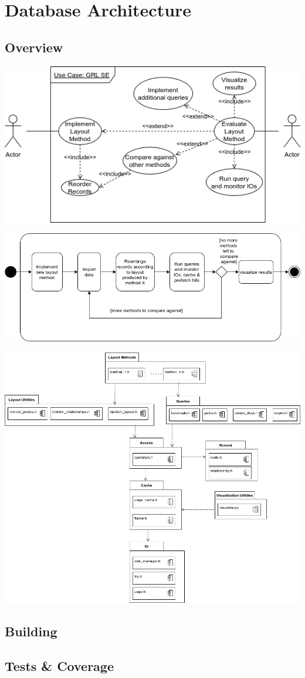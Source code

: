 \section{Database Architecture}

\subsection{Overview}
\begin{center}
    \includegraphics[keepaspectratio,width=.7\textwidth]{img/use_case.png}
\end{center}
		
\begin{center}
 \includegraphics[keepaspectratio, width=1\textwidth, height=\textheight]{img/activity.png}
\end{center}

\hspace{-2cm}\includegraphics[keepaspectratio,width=1.2\textwidth, height=.7\textheight]{img/overview.png}



\subsection{Building}

\subsection{Tests \& Coverage}



